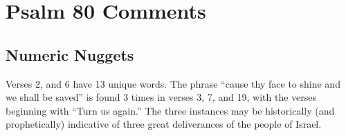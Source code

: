 \section{Psalm 80 Comments}

\subsection{Numeric  Nuggets}
Verses 2, and 6 have 13 unique words.  The phrase ``cause thy face to shine and we shall be saved'' is found 3 times in verses 3, 7, and 19, with the verses beginning with ``Turn us again.'' The three instances may be historically (and prophetically) indicative of three great deliverances of the people of Israel.